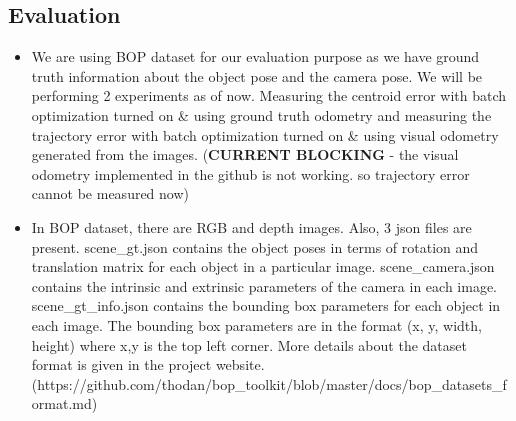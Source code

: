 \documentclass{article}
\begin{document}
\subsection{Evaluation}
\begin{itemize}
    \item We are using BOP dataset for our evaluation purpose as we have ground truth information about the object pose and the camera pose. We will be performing 2 experiments as of now. Measuring the centroid error with batch optimization turned on \& using ground truth odometry and measuring the trajectory error with batch optimization turned on \& using visual odometry generated from the images. (\textbf{CURRENT BLOCKING} - the visual odometry implemented in the github is not working. so trajectory error cannot be measured now)
    \item In BOP dataset, there are RGB and depth images. Also, 3 json files are present. scene\_gt.json contains the object poses in terms of rotation and translation matrix for each object in a particular image. scene\_camera.json contains the intrinsic and extrinsic parameters of the camera in each image. scene\_gt\_info.json contains the bounding box parameters for each object in each image. The bounding box parameters are in the format (x, y, width, height) where x,y is the top left corner. More details about the dataset format is given in the project website. \newline (https://github.com/thodan/bop\_toolkit/blob/master/docs/bop\_datasets\_format.md)
\end{itemize}
\end{document}
